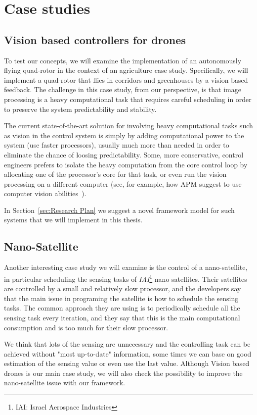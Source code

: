 \documentclass[11pt]{article}
\begin{document}
\section{Case studies}
\label{sec:Case study}

\subsection{Vision based controllers for drones}
To test our concepts, we will examine the implementation of an autonomously flying quad-rotor in the context of an agriculture case study. Specifically, we will implement a quad-rotor that flies in corridors and greenhouses by a vision based feedback. The challenge in this case study, from our perspective, is that image processing is a heavy computational task that requires careful scheduling in order to preserve the system predictability and stability.

The current state-of-the-art solution for involving heavy computational tasks such as vision in the control system is simply by adding computational power to the system (use faster processors), usually much more than needed in order to eliminate the chance of loosing predictability.
Some, more conservative, control engineers prefers to isolate the heavy computation from the core control loop by allocating one of the processor's core for that task, or even run the vision processing on a different computer (see, for example, how APM suggest to use computer vision abilities~\cite{APM}).

In Section~\ref{sec:Research Plan} we suggest a novel framework model for such systems that we will implement in this thesis.

\subsection{Nano-Satellite}
Another interesting case study we will examine is the control of a nano-satellite, in particular scheduling the sensing tasks of \textit{IAI}\footnote{IAI: Israel Aerospace Industries} nano satellites. Their satellites are controlled by a small and relatively slow processor, and the developers say that the main issue in programing the satellite is how to schedule the sensing tasks.
The common approach they are using is to periodically schedule all the sensing task every iteration, and they say that this is the main computational consumption and is too much for their slow processor.

We think that lots of the sensing are unnecessary and the controlling task can be achieved without "most up-to-date" information, some times we can base on good estimation of the sensing value or even use the last value. Although Vision based drones is our main case study, we will also check the possibility to improve the nano-satellite issue with our framework.
\end{document}
